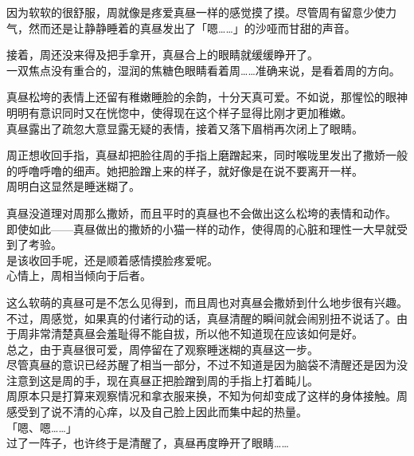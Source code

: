 因为软软的很舒服，周就像是疼爱真昼一样的感觉摸了摸。尽管周有留意少使力气，然而还是让静静睡着的真昼发出了「嗯……」的沙哑而甘甜的声音。

接着，周还没来得及把手拿开，真昼合上的眼睛就缓缓睁开了。\\

一双焦点没有重合的，湿润的焦糖色眼睛看着周……准确来说，是看着周的方向。

真昼松垮的表情上还留有稚嫩睡脸的余韵，十分天真可爱。不如说，那惺忪的眼神明明有意识同时又在恍惚中，使得现在这个样子显得比刚才更加稚嫩。\\

真昼露出了疏忽大意显露无疑的表情，接着又落下眉梢再次闭上了眼睛。

周正想收回手指，真昼却把脸往周的手指上磨蹭起来，同时喉咙里发出了撒娇一般的呼噜呼噜的细声。她把脸蹭上来的样子，就好像是在说不要离开一样。\\

周明白这显然是睡迷糊了。

真昼没道理对周那么撒娇，而且平时的真昼也不会做出这么松垮的表情和动作。\\

即使如此——真昼做出的撒娇的小猫一样的动作，使得周的心脏和理性一大早就受到了考验。\\

是该收回手呢，还是顺着感情摸脸疼爱呢。\\

心情上，周相当倾向于后者。

这么软萌的真昼可是不怎么见得到，而且周也对真昼会撒娇到什么地步很有兴趣。\\

不过，周感觉，如果真的付诸行动的话，真昼清醒的瞬间就会闹别扭不说话了。由于周非常清楚真昼会羞耻得不能自拔，所以他不知道现在应该如何是好。\\

总之，由于真昼很可爱，周停留在了观察睡迷糊的真昼这一步。\\

尽管真昼的意识已经苏醒了相当一部分，不过不知道是因为脑袋不清醒还是因为没注意到这是周的手，现在真昼正把脸蹭到周的手指上打着盹儿。\\

周原本只是打算来观察情况和拿衣服来换，不知为何却变成了这样的身体接触。周感受到了说不清的心痒，以及自己脸上因此而集中起的热量。\\

「嗯、嗯……」\\

过了一阵子，也许终于是清醒了，真昼再度睁开了眼睛……\\


